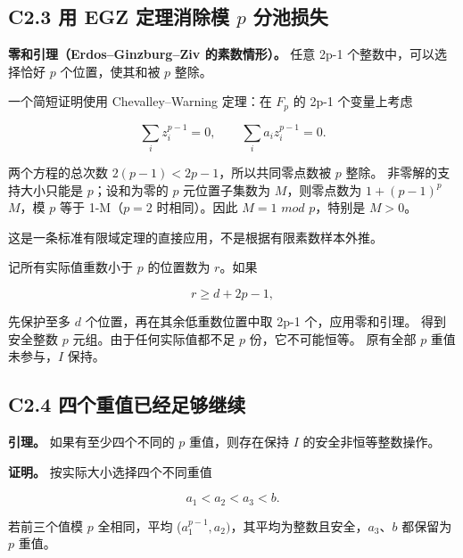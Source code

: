 \subsection*{\texorpdfstring{{C2.3} {用} {EGZ} {定理消除模} {\ensuremath{p}} {分池损失}}{C2.3 用 EGZ 定理消除模  分池损失}}\label{C2-h6}

\textbf{{零和引理（Erdos--Ginzburg--Ziv} {的素数情形）。}} {任意} {2p-1} {个整数中，可以选择恰好} {\ensuremath{p}} {个位置，使其和被} {\ensuremath{p}} {整除。}

{一个简短证明使用} {Chevalley--Warning} {定理：在} {\ensuremath{F_{p}}} {的} {2p-1} {个变量上考虑}

\[
\sum_i z_i^{p-1}=0,\qquad \sum_i a_i z_i^{p-1}=0.
\]

{两个方程的总次数} {\ensuremath{2(p-1)<2p-1}，所以共同零点数被} {\ensuremath{p}} {整除。} {非零解的支持大小只能是} {\ensuremath{p}；设和为零的} {\ensuremath{p}} {元位置子集数为} {\ensuremath{M}，则零点数为} {\ensuremath{1+(p-1)^{p}}} {\ensuremath{M}，模} {\ensuremath{p}} {等于} {1-M（\ensuremath{p=2}} {时相同）。因此} {\ensuremath{M=1}} {\ensuremath{mod}} {\ensuremath{p}，特别是} {\ensuremath{M>0}。}

{这是一条标准有限域定理的直接应用，不是根据有限素数样本外推。}

{记所有实际值重数小于} {\ensuremath{p}} {的位置数为} {\ensuremath{r}。如果}

\[
r\ge d+2p-1,
\tag{C2.4}
\]

{先保护至多} {\ensuremath{d}} {个位置，再在其余低重数位置中取} {2p-1} {个，应用零和引理。} {得到安全整数} {\ensuremath{p}} {元组。由于任何实际值都不足} {\ensuremath{p}} {份，它不可能恒等。} {原有全部} {\ensuremath{p}} {重值未参与，\ensuremath{I}} {保持。}

\subsection*{\texorpdfstring{{C2.4} {四个重值已经足够继续}}{C2.4 四个重值已经足够继续}}\label{C2-h7}

\textbf{{引理。}} {如果有至少四个不同的} {\ensuremath{p}} {重值，则存在保持} {\ensuremath{I}} {的安全非恒等整数操作。}

\textbf{{证明。}} {按实际大小选择四个不同重值}

\[
a_1<a_2<a_3<b.
\]

{若前三个值模} {\ensuremath{p}} {全相同，平均} {(\ensuremath{a_{1}^{p-1},a_{2})}，其平均为整数且安全，\ensuremath{a_{3}}、\ensuremath{b}} {都保留为} {\ensuremath{p}} {重值。}


